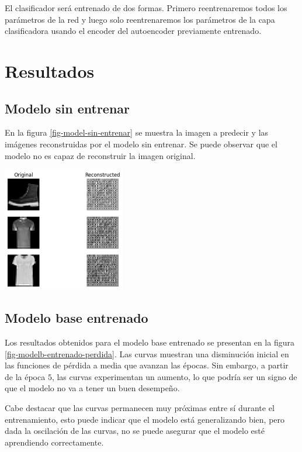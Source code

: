 \documentclass[aps,prl,reprint,groupedaddress]{revtex4-2}
\newenvironment{Figura}
  {\par\medskip\noindent\minipage{\linewidth}}
  {\endminipage\par\medskip}
\begin{document}
El clasificador será entrenado de dos formas. Primero reentrenaremos todos los
parámetros de la red y luego solo reentrenaremos los parámetros de la capa
clasificadora usando el encoder del autoencoder previamente entrenado.

\section{Resultados}
\subsection{Modelo sin entrenar}

En la figura \ref{fig-model-sin-entrenar} se muestra la imagen a predecir y las
imágenes reconstruidas por el modelo sin entrenar. Se puede observar que el
modelo no es capaz de reconstruir la imagen original.

\begin{Figura}
  \centering
  \includegraphics[width=0.4\textwidth]{figs1/modelo_sin_entrenar.png}
  \label{fig-model-sin-entrenar}
\end{Figura}

\subsection{Modelo base entrenado}

Los resultados obtenidos para el modelo base entrenado se presentan en la figura
\ref{fig-modelb-entrenado-perdida}. Las curvas muestran una disminución inicial 
en las funciones de pérdida a media que avanzan las épocas. Sin embargo, a 
partir de la época $5$, las curvas experimentan un aumento, lo que podría ser 
un signo de que el modelo no va a tener un buen desempeño. 

Cabe destacar que las curvas permanecen muy próximas entre sí durante el 
entrenamiento, esto puede indicar que el modelo está generalizando bien, pero
dada la oscilación de las curvas, no se puede asegurar que el modelo esté
aprendiendo correctamente.
\end{document}
